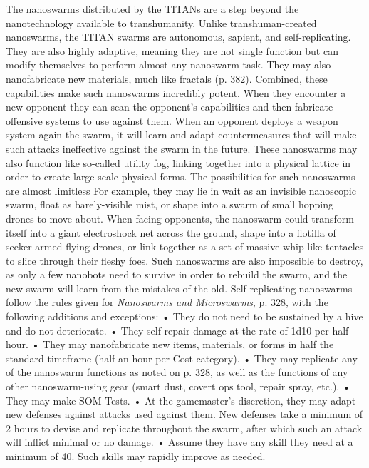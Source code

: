 The nanoswarms distributed by the TITANs are a step 
beyond the nanotechnology available to transhumanity. 
Unlike transhuman-created nanoswarms, the TITAN 
swarms are autonomous, sapient, and self-replicating. 
They are also highly adaptive, meaning they are not 
single function but can modify themselves to perform 
almost any nanoswarm task. They may also nanofabricate
new materials, much like fractals (p. 382).
Combined, these capabilities make such nanoswarms 
incredibly potent. When they encounter a new opponent
they can scan the opponent's capabilities and
then fabricate offensive systems to use against them. 
When an opponent deploys a weapon system again the 
swarm, it will learn and adapt countermeasures that 
will make such attacks ineffective against the swarm in 
the future. These nanoswarms may also function like 
so-called utility fog, linking together into a physical 
lattice in order to create large scale physical forms.
The possibilities for such nanoswarms are almost limitless
For example, they may lie in wait as an invisible
nanoscopic swarm, float as barely-visible mist, or shape 
into a swarm of small hopping drones to move about. 
When facing opponents, the nanoswarm could transform 
itself into a giant electroshock net across the ground, 
shape into a flotilla of seeker-armed flying drones, or 
link together as a set of massive whip-like tentacles to 
slice through their fleshy foes. Such nanoswarms are 
also impossible to destroy, as only a few nanobots need 
to survive in order to rebuild the swarm, and the new 
swarm will learn from the mistakes of the old.
Self-replicating nanoswarms follow the rules given 
for \textit{Nanoswarms and Microswarms}, p. 328, with the 
following additions and exceptions:
•  They do not need to be sustained by a hive and 
do not deteriorate.
•  They self-repair damage at the rate of 1d10 per 
half hour.
•  They may nanofabricate new items, materials, 
or forms in half the standard timeframe (half an 
hour per Cost category).
• They may replicate any of the nanoswarm functions
as noted on p. 328, as well as the functions
of any other nanoswarm-using gear (smart dust, 
covert ops tool, repair spray, etc.).
•  They may make SOM Tests.
•  At the gamemaster's discretion, they may adapt 
new defenses against attacks used against them. 
New defenses take a minimum of 2 hours to devise 
and replicate throughout the swarm, after which 
such an attack will inflict minimal or no damage.
• Assume they have any skill they need at a minimum
of 40. Such skills may rapidly improve
as needed.

